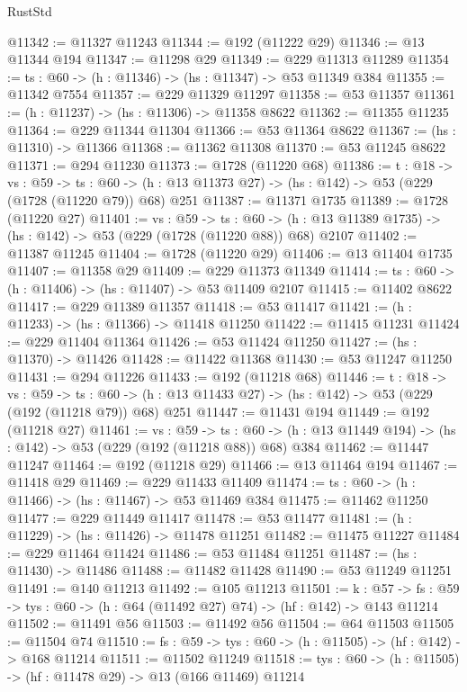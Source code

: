 \begin{lexlean}{RustStd}
\begin{coremodule}
@11342 := @11327 @11243
@11344 := @192 (@11222 @29)
@11346 := @13 @11344 @194
@11347 := @11298 @29
@11349 := @229 @11313 @11289
@11354 := {ts : @60} -> (h : @11346) -> (hs : @11347) -> @53 @11349 @384
@11355 := @11342 @7554
@11357 := @229 @11329 @11297
@11358 := @53 @11357
@11361 := (h : @11237) -> (hs : @11306) -> @11358 @8622
@11362 := @11355 @11235
@11364 := @229 @11344 @11304
@11366 := @53 @11364 @8622
@11367 := (hs : @11310) -> @11366
@11368 := @11362 @11308
@11370 := @53 @11245 @8622
@11371 := @294 @11230
@11373 := @1728 (@11220 @68)
@11386 := {t : @18} ->
  {vs : @59} ->
  {ts : @60} -> (h : @13 @11373 @27) -> (hs : @142) -> @53 (@229 (@1728 (@11220 @79)) @68) @251
@11387 := @11371 @1735
@11389 := @1728 (@11220 @27)
@11401 := {vs : @59} ->
  {ts : @60} -> (h : @13 @11389 @1735) -> (hs : @142) -> @53 (@229 (@1728 (@11220 @88)) @68) @2107
@11402 := @11387 @11245
@11404 := @1728 (@11220 @29)
@11406 := @13 @11404 @1735
@11407 := @11358 @29
@11409 := @229 @11373 @11349
@11414 := {ts : @60} -> (h : @11406) -> (hs : @11407) -> @53 @11409 @2107
@11415 := @11402 @8622
@11417 := @229 @11389 @11357
@11418 := @53 @11417
@11421 := (h : @11233) -> (hs : @11366) -> @11418 @11250
@11422 := @11415 @11231
@11424 := @229 @11404 @11364
@11426 := @53 @11424 @11250
@11427 := (hs : @11370) -> @11426
@11428 := @11422 @11368
@11430 := @53 @11247 @11250
@11431 := @294 @11226
@11433 := @192 (@11218 @68)
@11446 := {t : @18} ->
  {vs : @59} ->
  {ts : @60} -> (h : @13 @11433 @27) -> (hs : @142) -> @53 (@229 (@192 (@11218 @79)) @68) @251
@11447 := @11431 @194
@11449 := @192 (@11218 @27)
@11461 := {vs : @59} ->
  {ts : @60} -> (h : @13 @11449 @194) -> (hs : @142) -> @53 (@229 (@192 (@11218 @88)) @68) @384
@11462 := @11447 @11247
@11464 := @192 (@11218 @29)
@11466 := @13 @11464 @194
@11467 := @11418 @29
@11469 := @229 @11433 @11409
@11474 := {ts : @60} -> (h : @11466) -> (hs : @11467) -> @53 @11469 @384
@11475 := @11462 @11250
@11477 := @229 @11449 @11417
@11478 := @53 @11477
@11481 := (h : @11229) -> (hs : @11426) -> @11478 @11251
@11482 := @11475 @11227
@11484 := @229 @11464 @11424
@11486 := @53 @11484 @11251
@11487 := (hs : @11430) -> @11486
@11488 := @11482 @11428
@11490 := @53 @11249 @11251
@11491 := @140 @11213
@11492 := @105 @11213
@11501 := {k : @57} ->
  {fs : @59} -> {tys : @60} -> (h : @64 (@11492 @27) @74) -> (hf : @142) -> @143 @11214
@11502 := @11491 @56
@11503 := @11492 @56
@11504 := @64 @11503
@11505 := @11504 @74
@11510 := {fs : @59} -> {tys : @60} -> (h : @11505) -> (hf : @142) -> @168 @11214
@11511 := @11502 @11249
@11518 := {tys : @60} -> (h : @11505) -> (hf : @11478 @29) -> @13 (@166 @11469) @11214

\end{coremodule}
\end{lexlean}
